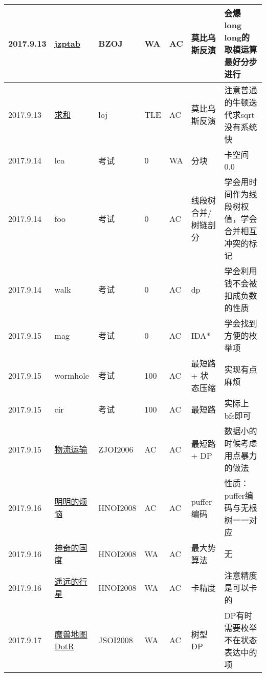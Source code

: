 \documentclass[a4paper]{article}
\begin{document}
\begin{longtable}{|p{1.5cm}|p{2.5cm}|p{1.6cm}|p{1.6cm}|p{1cm}|p{3cm}|p{4cm}|}
		\hline
		2017.9.13 & \href {http://www.lydsy.com/JudgeOnline/problem.php?id=2693}{jzptab}
		 & BZOJ & WA & AC & 莫比乌斯反演 & 会爆long long的取模运算最好分步进行\\
		
		\hline
		2017.9.13 & \href {https://loj.ac/problem/528}{求和}
		 & loj & TLE & AC & 莫比乌斯反演 & 注意普通的牛顿迭代求sqrt没有系统快\\
		
		\hline
		2017.9.14 & lca
		 & 考试 & 0 & WA & 分块 & 卡空间0.0\\
		
		\hline
		2017.9.14 & foo
		 & 考试 & 0 & AC & 线段树合并/树链剖分 & 学会用时间作为线段树权值，学会合并相互冲突的标记\\
		
		\hline
		2017.9.14 & walk
		 & 考试 & 0 & AC & dp & 学会利用钱不会被扣成负数的性质\\
		
		\hline
		2017.9.15 & mag
		 & 考试 & 0 & AC & IDA* & 学会找到方便的枚举项\\
		
		\hline
		2017.9.15 & wormhole
		 & 考试 & 100 & AC & 最短路 + 状态压缩 & 实现有点麻烦\\

		\hline
		2017.9.15 & cir
		 & 考试 & 100 & AC & 最短路 & 实际上bfs即可\\
		
		\hline
		2017.9.15 & \href {http://www.lydsy.com/JudgeOnline/problem.php?id=1003}{物流运输}
		 & ZJOI2006 & AC & AC & 最短路 + DP & 数据小的时候考虑用点暴力的做法\\
		
		\hline
		2017.9.16 & \href {http://www.lydsy.com/JudgeOnline/problem.php?id=1005}{明明的烦恼}
		 & HNOI2008 & AC & AC & puffer编码 & 性质：puffer编码与无根树一一对应\\
		
		\hline
		2017.9.16 & \href {http://www.lydsy.com/JudgeOnline/problem.php?id=1006}{神奇的国度}
		 & HNOI2008 & WA & AC & 最大势算法 & 无\\
		
		\hline
		2017.9.16 & \href {http://www.lydsy.com/JudgeOnline/problem.php?id=1011}{遥远的行星}
		 & HNOI2008 & WA & AC & 卡精度 & 注意精度是可以卡的\\
		
		\hline
		2017.9.17 & \href {http://www.lydsy.com/JudgeOnline/problem.php?id=1017}{魔兽地图DotR}
		 & JSOI2008 & WA & AC & 树型DP & DP有时需要枚举不在状态表达中的项\\
		

\end{longtable}
\end{document}
